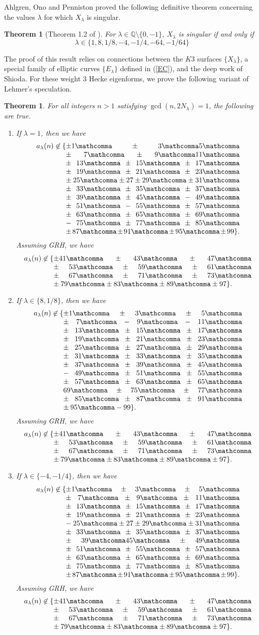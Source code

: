 \documentclass[12pt]{amsart}
\newtheorem{thm}{Theorem}[section]
\newcommand{\Q}{\mathbb{Q}}
\newcommand{\numberlist}[2][0.8\linewidth]{%
  \{\parbox[t]{#1}{\printcommalist{#2}}%
  }
\newcommand{\printcommalist}[1]{%
  \begingroup\lccode`~=`,\lowercase{\endgroup\def~}{\mathcomma\penalty0 }%
  \mathcode`,="8000
  \thinmuskip=6mu plus 6mu minus 2mu
  $#1\}.$
}
\newtheorem*{theorem*}{Theorem}
\numberwithin{equation}{section}
\begin{document}
Ahlgren, Ono and Penniston proved the following definitive theorem concerning the values $\lambda$ for which $X_\lambda$ is singular.
\begin{theorem*}[Theorem 1.2 of \cite{AOP}]\label{ClassificationTheorem}
For $\lambda\in \Q\setminus\{0,-1\}$, $X_\lambda$ is singular if and only if $$\lambda\in \{1,8,1/8,-4,-1/4,-64,-1/64\}$$
\end{theorem*}
The proof of this result relies on connections between the $K3$ surfaces $\{X_\lambda\}$, a special family of elliptic curves $\{E_\lambda\}$ defined in (\ref{EC}), and the deep work of Shioda. For these weight $3$ Hecke eigenforms, we prove the following variant of Lehmer's speculation.

\begin{thm}\label{1.2}
For all integers $n>1$ satisfying $\gcd(n, 2N_{\lambda})=1$, the following are true. 
\begin{enumerate}
\item If $\lambda=1$, then we have
\begin{align*}
a_\lambda(n)\not \in \numberlist[.71\linewidth]{\pm 1,\pm 3,5, \pm 7,\pm 9, 11, \pm13,\pm15, \pm 17, \pm 19,\pm21, \pm23,\pm25,\pm27 \pm29, \pm 31,\pm33,\pm35,\pm 37,\pm39,\pm 45,-49,\pm51,-55, \pm57,\pm63,\pm65,\pm69,-75,\pm77,\pm85,\pm87,\pm91,\pm95,\pm99}
\end{align*}
Assuming \textit{GRH}, we have 
\begin{align*}
    a_\lambda(n)\not \in \numberlist[.81\linewidth]{\pm41, \pm 43, \pm47, \pm53, \pm59, \pm61, \pm 67, \pm 71, \pm 73, \pm79, \pm 83, \pm89, \pm 97}
\end{align*}
    
\item If $\lambda\in \{8, 1/8\}$, then we have
\begin{align*}
a_\lambda(n)\not \in \numberlist[.73\linewidth]{\pm 1,\pm 3,\pm5, \pm7,-9, -11, \pm 13,\pm15, \pm 17, \pm 19,\pm21, \pm23,\pm25,\pm27, \pm29, \pm 31,\pm33,\pm35,
\pm37,\pm39,\pm 45,-49,\pm51,\pm55,\pm57,\pm63,\pm65,69,\pm 75,\pm77,\pm85,\pm87,\pm91,\pm95,-99}
\end{align*}
Assuming \textit{GRH}, we have 
\begin{align*}
    a_\lambda(n)\not \in \numberlist[.81\linewidth]{\pm 41, \pm 43, \pm47, \pm53, \pm59, \pm 61, \pm 67, \pm 71, \pm73, \pm 79, \pm 83, \pm89, \pm 97}
\end{align*}    


\item If $\lambda\in \{-4, -1/4\}$, then we have
\begin{align*}
a_\lambda(n)\not \in \numberlist[.71\linewidth]{\pm 1,\pm 3,\pm5, \pm 7,\pm9,\pm 11,\pm 13,\pm15, \pm 17, \pm 19,\pm21, \pm23,-25,\pm27 \pm29, \pm 31,\pm33,\pm35,
\pm 37,\pm39,45,\pm49,\pm51,\pm55,\pm57,\pm63,\pm65,\pm69,\pm 75,\pm77,\pm85,\pm87,\pm91,\pm95,\pm99}
\end{align*}
Assuming \textit{GRH}, we have 
\begin{align*}
    a_\lambda(n)\not \in \numberlist[.81\linewidth]{\pm41, \pm 43, \pm47, \pm53, \pm59, \pm 61, \pm 67, \pm 71,\pm73, \pm79, \pm83, \pm89, \pm 97}
\end{align*}    
    

\end{enumerate}
\end{thm}
\end{document}

